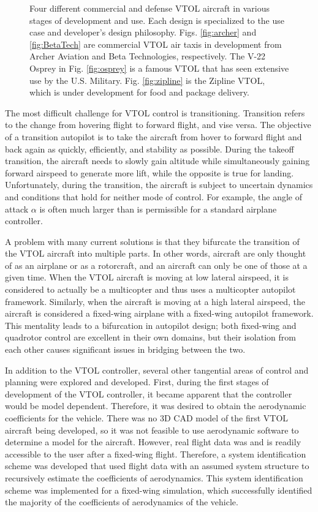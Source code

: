 \begin{figure}[htbp]
    \caption{Four different commercial and defense VTOL aircraft in various stages of development and use. Each design is specialized to the use case and developer's design philosophy. Figs. \ref{fig:archer} and \ref{fig:BetaTech} are commercial VTOL air taxis in development from Archer Aviation and Beta Technologies, respectively. The V-22 Osprey in Fig. \ref{fig:osprey} is a famous VTOL that has seen extensive use by the U.S. Military. Fig. \ref{fig:zipline} is the Zipline VTOL, which is under development for food and package delivery.}
    \label{fig:eVTOLExamples}
\end{figure}

The most difficult challenge for VTOL control is transitioning. 
Transition refers to the change from hovering flight to forward flight, and vise versa. 
The objective of a transition autopilot is to take the aircraft from hover to forward flight and back again as quickly, efficiently, and stability as possible. 
During the takeoff transition, the aircraft needs to slowly gain altitude while simultaneously gaining forward airspeed to generate more lift, while the opposite is true for landing. 
Unfortunately, during the transition, the aircraft is subject to uncertain dynamics and conditions that hold for neither mode of control. 
For example, the angle of attack $\alpha$ is often much larger than is permissible for a standard airplane controller. 

A problem with many current solutions is that they bifurcate the transition of the VTOL aircraft into multiple parts. 
In other words, aircraft are only thought of as an airplane or as a rotorcraft, and an aircraft can only be one of those at a given time. 
When the VTOL aircraft is moving at low lateral airspeed, it is considered to actually be a multicopter and thus uses a multicopter autopilot framework. 
Similarly, when the aircraft is moving at a high lateral airspeed, the aircraft is considered a fixed-wing airplane with a fixed-wing autopilot framework. 
This mentality leads to a bifurcation in autopilot design; both fixed-wing and quadrotor control are excellent in their own domains, but their isolation from each other causes significant issues in bridging between the two. 

In addition to the VTOL controller, several other tangential areas of control and planning were explored and developed.
First, during the first stages of development of the VTOL controller, it became apparent that the controller would be model dependent.
Therefore, it was desired to obtain the aerodynamic coefficients for the vehicle.
There was no 3D CAD model of the first VTOL aircraft being developed, so it was not feasible to use aerodynamic software to determine a model for the aircraft.
However, real flight data was and is readily accessible to the user after a fixed-wing flight.
Therefore, a system identification scheme was developed that used flight data with an assumed system structure to recursively estimate the coefficients of aerodynamics.
This system identification scheme was implemented for a fixed-wing simulation, which successfully identified the majority of the coefficients of aerodynamics of the vehicle.

